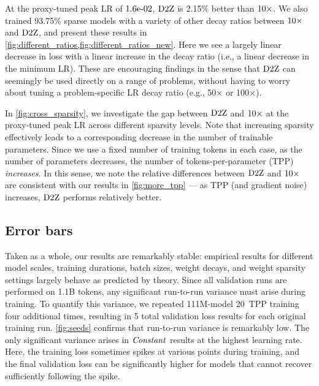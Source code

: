 At the proxy-tuned peak LR of $1.6\mbox{e-}02$, $\mbox{D2Z}$ is 2.15\% better than
$\mbox{10}\times$.  We also trained 93.75\% sparse models with a variety of
other decay ratios between $\mbox{10}\times$ and $\mbox{D2Z}$, and present these
results in \cref{fig:different_ratios,fig:different_ratios_new}.
%
Here we see a largely linear decrease in loss with a linear increase
in the decay ratio (i.e., a linear decrease in the minimum LR).
%
These are encouraging findings in the sense that $\mbox{D2Z}$ can seemingly
be used directly on a range of problems, without having to worry about
tuning a problem-specific LR decay ratio (e.g., 50$\times$ or
100$\times$).



In \cref{fig:cross_sparsity}, we investigate the gap between
$\mbox{D2Z}$ and $\mbox{10}\times$ at the proxy-tuned peak LR across different sparsity
levels.  Note that increasing sparsity effectively leads to a
corresponding decrease in the number of trainable parameters.  Since
we use a fixed number of training tokens in each case, as the number
of parameters decreases, the number of tokens-per-parameter (TPP)
\emph{increases}.
%
In this sense, we note the relative differences between $\mbox{D2Z}$ and
$\mbox{10}\times$ are consistent with our results in \cref{fig:more_tpp}
--- as TPP (and gradient noise) increases, $\mbox{D2Z}$ performs relatively
better.

\subsection{Error bars}




Taken as a whole, our results are remarkably stable: empirical results
for different model scales, training durations, batch sizes, weight
decays, and weight sparsity settings largely behave as predicted by
theory.  Since all validation runs are performed on 1.1B tokens, any
significant run-to-run variance must arise during training.
%
To quantify this variance, we repeated 111M-model 20~TPP training four
additional times, resulting in 5 total validation loss results for
each original training run.  \cref{fig:seeds} confirms that
run-to-run variance is remarkably low.  The only significant variance
arises in $\mbox{\emph{Constant}}$ results at the highest learning rate.  Here, the
training loss sometimes spikes at various points during training, and
the final validation loss can be significantly higher for models that
cannot recover sufficiently following the spike.

